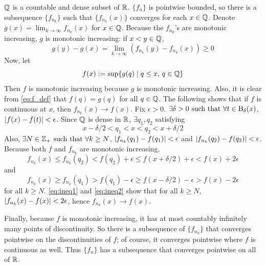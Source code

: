 \documentclass[12pt]{article}
\begin{document}
$\mathbb{Q}$ is a countable and dense subset of $\mathbb{R}$. 
$\{f_n\}$ is pointwise bounded, so there is a subsequence $\{f_{n_k}\}$ such that $\{f_{n_k}(x)\}$ converges for each $x \in \mathbb{Q}$.
Denote $g(x) = \lim_{k \rightarrow \infty} f_{n_k} (x)$ for $x \in \mathbb{Q}$. 
Because the $f_{n_k}$'s are monotonic increasing, $g$ is monotonic increasing: 
if $x < y \in \mathbb{Q}$, 
$$g(y) - g(x) = \lim_{k \rightarrow \infty} (f_{n_k}(y) - f_{n_k}(x)) \geq 0$$
Now, let 
\begin{equation} \label{eq:f_def}
  f(x) \vcentcolon= \sup\{g(q) \mid q \leq x, \, q \in \mathbb{Q}\}
\end{equation}
Then $f$ is monotonic increasing because $g$ is monotonic increasing. 
Also, it is clear from \eqref{eq:f_def} that $f(q) = g(q)$ for all $q \in \mathbb{Q}$. 
The following shows that if $f$ is continuous at $x$, then $f_{n_k}(x) \rightarrow f(x)$. 
Fix $\epsilon > 0$. 
$\exists \delta > 0 \text{ such that } \forall t \in \text{B}_{\delta}(x)$, $\left|f(x) - f(t)\right| < \epsilon$. 
Since $\mathbb{Q}$ is dense in $\mathbb{R}$, $\exists q_1, q_2$ satisfying 
$$x - \delta / 2 < q_1 < x < q_2 < x + \delta / 2$$
Also, $\exists N \in \mathbb{Z}_{+} \text{ such that } \forall k \geq N$, $\left|f_{n_k} (q_1) - f(q_1)\right| < \epsilon$ and $\left|f_{n_k}(q_2) - f(q_2)\right| < \epsilon$. 
Because both $f$ and $f_{n_k}$ are monotonic increasing,  
\begin{equation} \label{eq:ineq1}
  f_{n_k}(x) \leq f_{n_k} (q_2) < f(q_2) + \epsilon \leq f(x + \delta / 2) + \epsilon < f(x) + 2\epsilon
\end{equation}
and 
\begin{equation} \label{eq:ineq2}
  f_{n_k}(x) \geq f_{n_k}(q_1) > f(q_1) - \epsilon \geq f(x - \delta / 2) - \epsilon > f(x) - 2\epsilon
\end{equation}
for all $k \geq N$. 
\eqref{eq:ineq1} and \eqref{eq:ineq2} show that for all $k \geq N$, $\left|f_{n_k}(x) - f(x)\right| < 2\epsilon$, hence $f_{n_k}(x) \rightarrow f(x)$. 

Finally, because $f$ is monotonic increasing, it has at most countably infinitely many points of discontinuity. 
So there is a subsequence of $\{f_{n_k}\}$ that converges pointwise on the discontinuities of $f$; 
of course, it converges pointwise where $f$ is continuous as well. 
Thus $\{f_n\}$ has a subsequence that converges pointwise on all of $\mathbb{R}$. 
\end{document}
